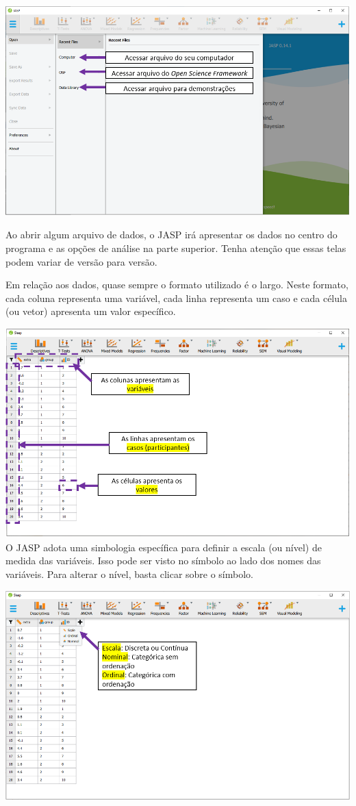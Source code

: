 \documentclass[
]{book}
\begin{document}
\includegraphics{./img/cap_jasp_abrir2.png}

Ao abrir algum arquivo de dados, o JASP irá apresentar os dados no centro do programa e as opções de análise na parte superior. Tenha atenção que essas telas podem variar de versão para versão.

Em relação aos dados, quase sempre o formato utilizado é o largo. Neste formato, cada coluna representa uma variável, cada linha representa um caso e cada célula (ou vetor) apresenta um valor específico.

\includegraphics{./img/cap_jasp_dados.png}
O JASP adota uma simbologia específica para definir a escala (ou nível) de medida das variáveis. Isso pode ser visto no símbolo ao lado dos nomes das variáveis. Para alterar o nível, basta clicar sobre o símbolo.

\includegraphics{./img/cap_jasp_tipo_de_dados.png}
\end{document}
